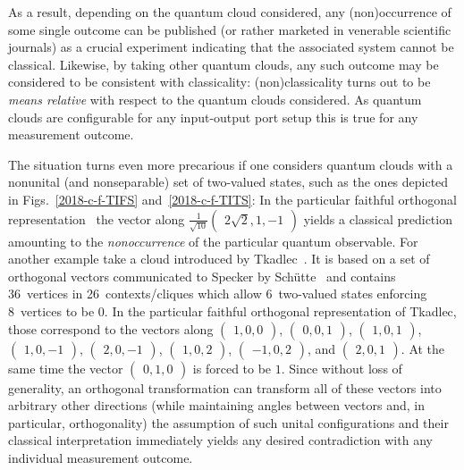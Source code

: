 \documentclass[%
  reprint,
  twocolumn,
 showpacs,
 showkeys,
 preprintnumbers,
 amsmath,amssymb,
 aps,
  prl,
  longbibliography,
 ]{revtex4-1}
\begin{document}
As a result, depending on the quantum cloud considered, any (non)occurrence of some single outcome can be published
(or rather marketed in venerable scientific journals)
as a crucial experiment indicating that the associated system cannot be classical.
Likewise, by taking other quantum clouds, any such outcome may be considered to be consistent with classicality:
(non)classicality turns out to be {\em means relative} with respect to the quantum clouds considered.
As quantum clouds are configurable for any input-output port setup this is true for any measurement outcome.


The situation turns even more precarious if one considers quantum clouds with a nonunital (and nonseparable) set of two-valued states,
such as the ones
depicted in Figs.~\ref{2018-c-f-TIFS} and~\ref{2018-c-f-TITS}:
In the particular faithful orthogonal
representation~\cite[Table~1, p.~102201-7]{2015-AnalyticKS}
the vector along
$\frac{1}{\sqrt{10}}\begin{pmatrix} 2\sqrt{2},1,-1 \end{pmatrix}$
yields a classical prediction amounting to the {\em nonoccurrence} of the particular
quantum observable. For another example
take a cloud introduced by Tkadlec~\cite[Fig.~2]{tkadlec-96}.
It is based on a set of orthogonal vectors
communicated to Specker by Sch\"utte~\cite{clavadetscher} and contains
36~vertices in 26~contexts/cliques which allow 6~two-valued states
enforcing 8~vertices to be $0$. In the particular faithful orthogonal representation of Tkadlec,
those correspond to the vectors along
$\begin{pmatrix} 1,0,0 \end{pmatrix}$,
$\begin{pmatrix} 0,0,1 \end{pmatrix}$,
$\begin{pmatrix} 1,0,1 \end{pmatrix}$,
$\begin{pmatrix} 1,0,-1 \end{pmatrix}$,
$\begin{pmatrix} 2,0,-1 \end{pmatrix}$,
$\begin{pmatrix} 1,0,2 \end{pmatrix}$,
$\begin{pmatrix} -1,0,2 \end{pmatrix}$, and
$\begin{pmatrix} 2,0,1 \end{pmatrix}$.
At the same time the vector
$\begin{pmatrix} 0,1,0 \end{pmatrix}$ is forced to be $1$.
Since without loss of generality, an orthogonal transformation can transform all of
these vectors into arbitrary other directions (while maintaining angles between vectors and,
in particular, orthogonality)
the assumption of such unital configurations
and their classical interpretation
immediately yields any desired contradiction
with any individual measurement outcome.
\end{document}
